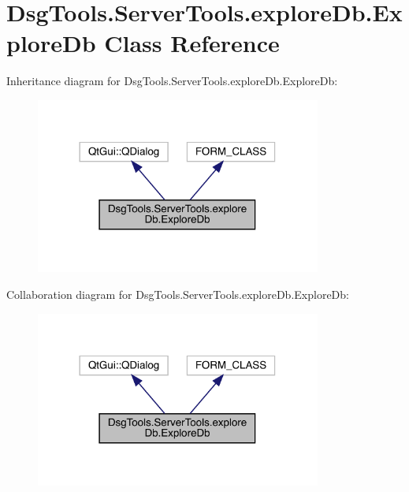 \hypertarget{class_dsg_tools_1_1_server_tools_1_1explore_db_1_1_explore_db}{}\section{Dsg\+Tools.\+Server\+Tools.\+explore\+Db.\+Explore\+Db Class Reference}
\label{class_dsg_tools_1_1_server_tools_1_1explore_db_1_1_explore_db}


Inheritance diagram for Dsg\+Tools.\+Server\+Tools.\+explore\+Db.\+Explore\+Db\+:
\nopagebreak
\begin{figure}[H]
\begin{center}
\leavevmode
\includegraphics[width=266pt]{class_dsg_tools_1_1_server_tools_1_1explore_db_1_1_explore_db__inherit__graph}
\end{center}
\end{figure}


Collaboration diagram for Dsg\+Tools.\+Server\+Tools.\+explore\+Db.\+Explore\+Db\+:
\nopagebreak
\begin{figure}[H]
\begin{center}
\leavevmode
\includegraphics[width=266pt]{class_dsg_tools_1_1_server_tools_1_1explore_db_1_1_explore_db__coll__graph}
\end{center}
\end{figure}

